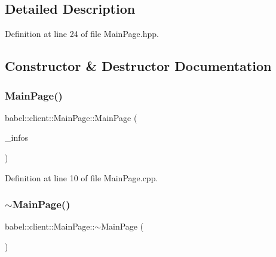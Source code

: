 \subsection{Detailed Description}


Definition at line 24 of file Main\+Page.\+hpp.



\subsection{Constructor \& Destructor Documentation}
\mbox{\label{classbabel_1_1client_1_1_main_page_ae98d1ec7f7eecae6cbbed21ffeaa1762}} 
\subsubsection{\texorpdfstring{Main\+Page()}{MainPage()}}
{\footnotesize\ttfamily babel\+::client\+::\+Main\+Page\+::\+Main\+Page (\begin{DoxyParamCaption}\item[{\mbox{\hyperlink{classbabel_1_1client_1_1_client_info}{client\+::\+Client\+Info}} \&}]{\+\_\+infos }\end{DoxyParamCaption})\hspace{0.3cm}{\ttfamily [explicit]}}



Definition at line 10 of file Main\+Page.\+cpp.

\mbox{\label{classbabel_1_1client_1_1_main_page_a94e35edc679b094fcfe80246a386c0c0}} 
\subsubsection{\texorpdfstring{$\sim$\+Main\+Page()}{~MainPage()}}
{\footnotesize\ttfamily babel\+::client\+::\+Main\+Page\+::$\sim$\+Main\+Page (\begin{DoxyParamCaption}{ }\end{DoxyParamCaption})}



